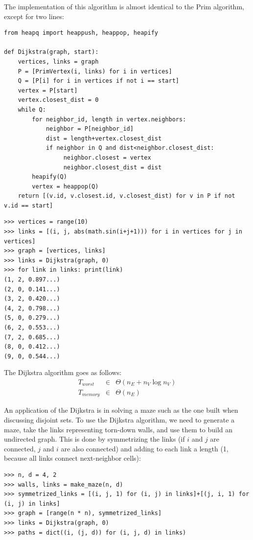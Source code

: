 \documentclass[justified, sixbynine]{tufte-book}
\def\ft{\small\tt}
\theoremstyle{plain}%
\newtheorem * {corollary}{Corollary}
\theoremstyle{definition}
\theoremstyle{remark}
\newtheorem * {remark}{Remark}
\newtheorem * {note}{Note}
\begin{document}
\begin{fullwidth}
The implementation of this algorithm is almost identical to the Prim algorithm, except for two lines:

\begin{lstlisting}[caption={in file: {\ft nlib.py}}]
from heapq import heappush, heappop, heapify

def Dijkstra(graph, start):
    vertices, links = graph
    P = [PrimVertex(i, links) for i in vertices]
    Q = [P[i] for i in vertices if not i == start]
    vertex = P[start]
    vertex.closest_dist = 0
    while Q:
        for neighbor_id, length in vertex.neighbors:
            neighbor = P[neighbor_id]
            dist = length+vertex.closest_dist
            if neighbor in Q and dist<neighbor.closest_dist:
                 neighbor.closest = vertex
                 neighbor.closest_dist = dist
        heapify(Q)
        vertex = heappop(Q)
    return [(v.id, v.closest.id, v.closest_dist) for v in P if not v.id == start]
\end{lstlisting}

\begin{lstlisting}[caption={in file: {\ft nlib.py}}]
>>> vertices = range(10)
>>> links = [(i, j, abs(math.sin(i+j+1))) for i in vertices for j in vertices]
>>> graph = [vertices, links]
>>> links = Dijkstra(graph, 0)
>>> for link in links: print(link)
(1, 2, 0.897...)
(2, 0, 0.141...)
(3, 2, 0.420...)
(4, 2, 0.798...)
(5, 0, 0.279...)
(6, 2, 0.553...)
(7, 2, 0.685...)
(8, 0, 0.412...)
(9, 0, 0.544...)
\end{lstlisting}

The Dijkstra algorithm goes as follows:
\begin{eqnarray}
T_{worst} &\in &\Theta (n_E+n_V\log n_V) \\
T_{memory} &\in &\Theta (n_E)
\end{eqnarray}

An application of the Dijkstra is in solving a maze such as the one built when discussing disjoint sets. To use the Dijkstra algorithm, we need to generate a maze, take the links representing torn-down walls, and use them to build an undirected graph. This is done by symmetrizing the links (if $i$ and $j$ are connected, $j$ and $i$ are also connected) and adding to each link a length (1, because all links connect next-neighbor cells):


\begin{lstlisting}
>>> n, d = 4, 2
>>> walls, links = make_maze(n, d)
>>> symmetrized_links = [(i, j, 1) for (i, j) in links]+[(j, i, 1) for (i, j) in links]
>>> graph = [range(n * n), symmetrized_links]
>>> links = Dijkstra(graph, 0)
>>> paths = dict((i, (j, d)) for (i, j, d) in links)
\end{lstlisting}


\end{fullwidth}
\end{document}
